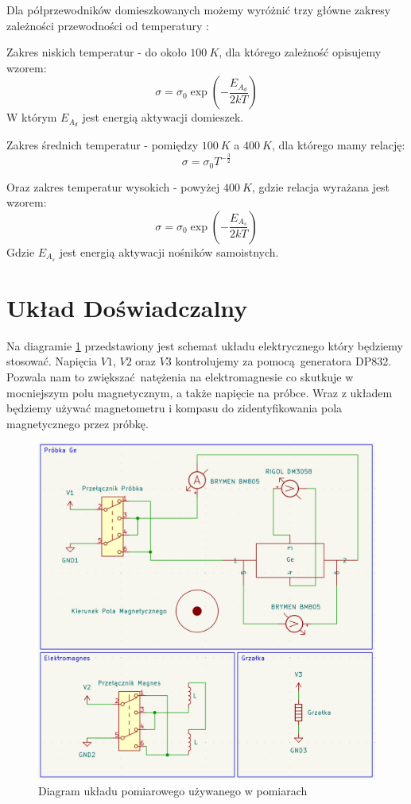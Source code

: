 \documentclass[12pt]{article}
\begin{document}
Dla półprzewodników domieszkowanych możemy wyróżnić trzy główne zakresy zależności przewodności od temperatury \cite{skrypt}:

Zakres niskich temperatur - do około $100 \ K$, dla którego zależność opisujemy wzorem:
\[
    \sigma = \sigma_0 \exp{(-\frac{E_{A_d}}{2kT})}
\]
W którym $E_{A_d}$ jest energią aktywacji domieszek.

Zakres średnich temperatur - pomiędzy $100 \ K$ a $400 \ K$, dla którego mamy relację:
\[
    \sigma = \sigma_0 T^{-\frac{3}{2}}
\]

Oraz zakres temperatur wysokich - powyżej $400 \ K$, gdzie relacja wyrażana jest wzorem:
\begin{equation}
    \sigma = \sigma_0 \exp{(-\frac{E_{A_s}}{2kT})}
    \label{eq:high_temp}
\end{equation}
Gdzie $E_{A_s}$ jest energią aktywacji nośników samoistnych.

\section{Układ Doświadczalny}

Na diagramie \ref{fig:diagram} przedstawiony jest schemat układu elektrycznego który będziemy stosować.
Napięcia $V1$, $V2$ oraz $V3$ kontrolujemy za pomocą generatora DP832. 
Pozwala nam to zwiększać natężenia na elektromagnesie co skutkuje w mocniejszym polu magnetycznym, a także napięcie na próbce.
Wraz z układem będziemy używać magnetometru i kompasu do zidentyfikowania pola magnetycznego przez próbkę.

\begin{figure}[H]
    \centering
    \includegraphics[scale=0.3]{diagram}
    \caption{Diagram układu pomiarowego używanego w pomiarach \cite{diagram}}
    \label{fig:diagram}
\end{figure}
\end{document}
